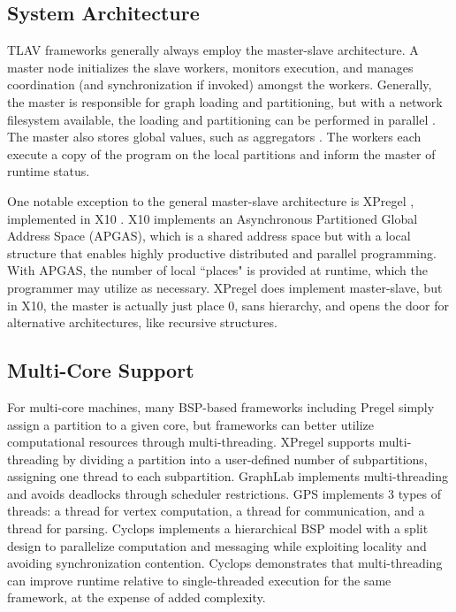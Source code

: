 \documentclass[reprint,twocolumn,showpacs,preprintnumbers,amsmath, aps,pre,amssymb]{revtex4-1}
\begin{document}
\subsection{System Architecture}

TLAV frameworks generally always employ the master-slave architecture.  A master node initializes the slave workers, monitors execution, and manages coordination (and synchronization if invoked) amongst the workers.  Generally, the master is responsible for graph loading and partitioning, but with a network filesystem available, the loading and partitioning can be performed in parallel \cite{Salihoglu2013}.  The master also stores global values, such as aggregators \cite{Malewicz2010}.  The workers each execute a copy of the program on the local partitions and inform the master of runtime status.

One notable exception to the general master-slave architecture is XPregel \cite{Bao2013}, implemented in X10 \cite{Charles2005}.  X10 implements an Asynchronous Partitioned Global Address Space (APGAS), which is a shared address space but with a local structure that enables highly productive distributed and parallel programming.  With APGAS, the number of local ``places" is provided at runtime, which the programmer may utilize as necessary.  XPregel does implement master-slave, but in X10, the master is actually just place 0, sans hierarchy, and opens the door for alternative architectures, like recursive structures.

\subsection{Multi-Core Support}

For multi-core machines, many BSP-based frameworks including Pregel \cite{Malewicz2010} simply assign a partition to a given core, but frameworks can better utilize computational resources through multi-threading.  XPregel \cite{Bao2013} supports multi-threading by dividing a partition into a user-defined number of subpartitions, assigning one thread to each subpartition.  GraphLab \cite{Low2012} implements multi-threading and avoids deadlocks through scheduler restrictions.  GPS \cite{Salihoglu2013} implements 3 types of threads: a thread for vertex computation, a thread for communication, and a thread for parsing.  Cyclops \cite{Chen2014} implements a hierarchical BSP model \cite{Cha2001hbsp} with a split design to parallelize computation and messaging while exploiting locality and avoiding synchronization contention.  Cyclops demonstrates that multi-threading can improve runtime relative to single-threaded execution for the same framework, at the expense of added complexity.
\end{document}
